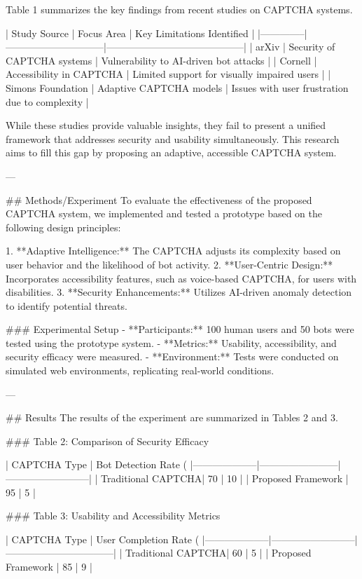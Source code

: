 Table 1 summarizes the key findings from recent studies on CAPTCHA systems.

| Study Source | Focus Area                   | Key Limitations Identified               |
|--------------|------------------------------|------------------------------------------|
| arXiv        | Security of CAPTCHA systems | Vulnerability to AI-driven bot attacks   |
| Cornell      | Accessibility in CAPTCHA    | Limited support for visually impaired users |
| Simons Foundation | Adaptive CAPTCHA models | Issues with user frustration due to complexity |

While these studies provide valuable insights, they fail to present a unified framework that addresses security and usability simultaneously. This research aims to fill this gap by proposing an adaptive, accessible CAPTCHA system.

---

## Methods/Experiment
To evaluate the effectiveness of the proposed CAPTCHA system, we implemented and tested a prototype based on the following design principles:

1. **Adaptive Intelligence:** The CAPTCHA adjusts its complexity based on user behavior and the likelihood of bot activity.
2. **User-Centric Design:** Incorporates accessibility features, such as voice-based CAPTCHA, for users with disabilities.
3. **Security Enhancements:** Utilizes AI-driven anomaly detection to identify potential threats.

### Experimental Setup
- **Participants:** 100 human users and 50 bots were tested using the prototype system.
- **Metrics:** Usability, accessibility, and security efficacy were measured.
- **Environment:** Tests were conducted on simulated web environments, replicating real-world conditions.

---

## Results
The results of the experiment are summarized in Tables 2 and 3.

### Table 2: Comparison of Security Efficacy

| CAPTCHA Type       | Bot Detection Rate (%
|--------------------|------------------------|--------------------------|
| Traditional CAPTCHA| 70                     | 10                       |
| Proposed Framework | 95                     | 5                        |

### Table 3: Usability and Accessibility Metrics

| CAPTCHA Type       | User Completion Rate (%
|--------------------|--------------------------|---------------------------------|
| Traditional CAPTCHA| 60                       | 5                               |
| Proposed Framework | 85                       | 9                               |

